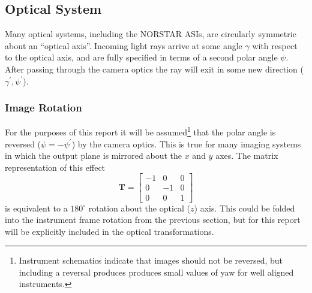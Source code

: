\documentclass[11pt,twoside]{article}   %
\begin{document}
%

%
 \subsection{Optical System}

Many optical systems, including the NORSTAR ASIs, are circularly
symmetric about an ``optical axis''.  Incoming light rays arrive
at some angle $\gamma$ with respect to the optical axis, and are
fully specified in terms of a second polar angle $\psi$.  After
passing through the camera optics the ray will exit in some new
direction ($\gamma^\prime, \psi^\prime$).


 \subsubsection{Image Rotation}
For the purposes of this report it will be
assumed\footnote{Instrument schematics indicate that images should
not be reversed, but including a reversal produces produces small
values of yaw for well aligned instruments.} that the polar angle
is reversed ($\psi= - \psi^\prime$) by the camera optics. This is
true for many imaging systems in which the output plane is
mirrored about the $x$ and $y$ axes. The matrix representation of
this effect
 \begin{equation}
  \mathbf{T} = \left [ \begin{array}{ccc}
  -1 & 0 & 0 \\
  0 & -1 & 0 \\
  0 & 0 & 1
  \end{array} \right ]
 \end{equation}
is equivalent to a $180^\circ$ rotation about the optical ($z$)
axis.  This could be folded into the instrument frame rotation
from the previous section, but for this report will be explicitly
included in the optical transformations.
\end{document}
